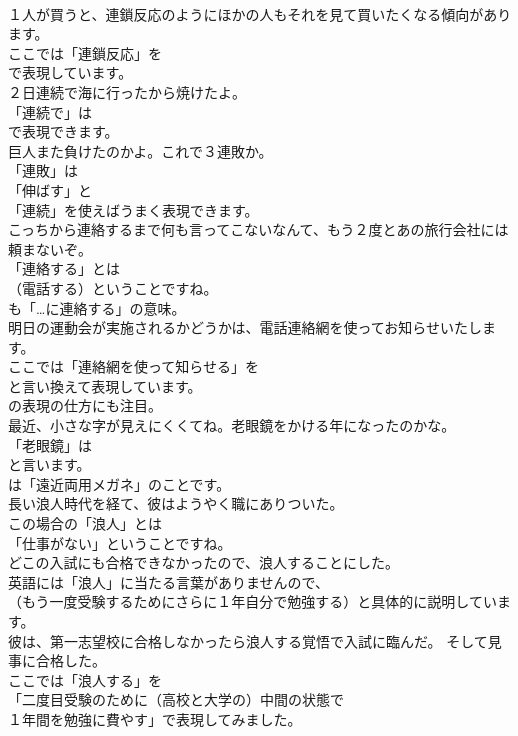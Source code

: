 \documentclass[8pt]{extreport}
\begin{document}
\begin{CJK}{UTF8}{min}
\\	１人が買うと、連鎖反応のようにほかの人もそれを見て買いたくなる傾向があります。 
\\	ここでは「連鎖反応」を 
\\	で表現しています。	
\\	２日連続で海に行ったから焼けたよ。 
\\	「連続で」は
\\	で表現できます。	
\\	巨人また負けたのかよ。これで３連敗か。 
\\	「連敗」は
\\	「伸ばす」と
\\	「連続」を使えばうまく表現できます。	
\\	こっちから連絡するまで何も言ってこないなんて、もう２度とあの旅行会社には頼まないぞ。 
\\	「連絡する」とは 
\\	（電話する）ということですね。
\\	も「…に連絡する」の意味。	
\\	明日の運動会が実施されるかどうかは、電話連絡網を使ってお知らせいたします。 
\\	ここでは「連絡網を使って知らせる」を
\\	と言い換えて表現しています。
\\	の表現の仕方にも注目。	
\\	最近、小さな字が見えにくくてね。老眼鏡をかける年になったのかな。 
\\	「老眼鏡」は
\\	と言います。
\\	は「遠近両用メガネ」のことです。	
\\	長い浪人時代を経て、彼はようやく職にありついた。 
\\	この場合の「浪人」とは
\\	「仕事がない」ということですね。	
\\	どこの入試にも合格できなかったので、浪人することにした。 
\\	英語には「浪人」に当たる言葉がありませんので、
\\	（もう一度受験するためにさらに１年自分で勉強する）と具体的に説明しています。	
\\	彼は、第一志望校に合格しなかったら浪人する覚悟で入試に臨んだ。 そして見事に合格した。 
\\	ここでは「浪人する」を
\\	「二度目受験のために（高校と大学の）中間の状態で
\\	１年間を勉強に費やす」で表現してみました。

\end{CJK}
\end{document}
